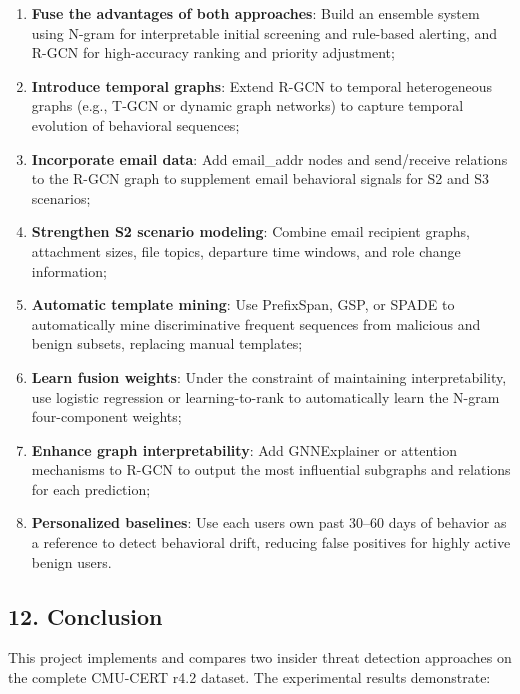 \documentclass[
  a4paper,
  11pt]{article}
\providecommand{\tightlist}{%
  \setlength{\itemsep}{0pt}\setlength{\parskip}{0pt}}
\begin{document}
\begin{enumerate}
\def\labelenumi{\arabic{enumi}.}
\tightlist
\item
  \textbf{Fuse the advantages of both approaches}: Build an ensemble
  system using N-gram for interpretable initial screening and rule-based
  alerting, and R-GCN for high-accuracy ranking and priority adjustment;
\item
  \textbf{Introduce temporal graphs}: Extend R-GCN to temporal
  heterogeneous graphs (e.g., T-GCN or dynamic graph networks) to
  capture temporal evolution of behavioral sequences;
\item
  \textbf{Incorporate email data}: Add email\_addr nodes and
  send/receive relations to the R-GCN graph to supplement email
  behavioral signals for S2 and S3 scenarios;
\item
  \textbf{Strengthen S2 scenario modeling}: Combine email recipient
  graphs, attachment sizes, file topics, departure time windows, and
  role change information;
\item
  \textbf{Automatic template mining}: Use PrefixSpan, GSP, or SPADE to
  automatically mine discriminative frequent sequences from malicious
  and benign subsets, replacing manual templates;
\item
  \textbf{Learn fusion weights}: Under the constraint of maintaining
  interpretability, use logistic regression or learning-to-rank to
  automatically learn the N-gram four-component weights;
\item
  \textbf{Enhance graph interpretability}: Add GNNExplainer or attention
  mechanisms to R-GCN to output the most influential subgraphs and
  relations for each prediction;
\item
  \textbf{Personalized baselines}: Use each user\textquotesingle s own
  past 30--60 days of behavior as a reference to detect behavioral
  drift, reducing false positives for highly active benign users.
\end{enumerate}

\subsection{12. Conclusion}\label{12-conclusion}

This project implements and compares two insider threat detection
approaches on the complete CMU-CERT r4.2 dataset. The experimental
results demonstrate:
\end{document}
